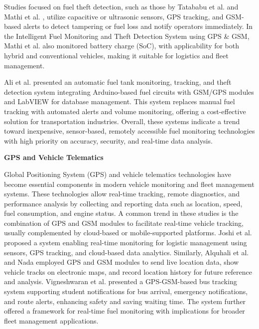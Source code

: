 Studies focused on fuel theft detection, such as those by Tatababu et al. \cite{tatababu2024smart} and Mathi et al. \cite{mathi2024development}, utilize capacitive or ultrasonic sensors, GPS tracking, and GSM-based alerts to detect tampering or fuel loss and notify operators immediately. In the Intelligent Fuel Monitoring and Theft Detection System using GPS \& GSM, Mathi et al. \cite{mathi2024development} also monitored battery charge (SoC), with applicability for both hybrid and conventional vehicles, making it suitable for logistics and fleet management.

Ali et al. \cite{komal2018automatic} presented an automatic fuel tank monitoring, tracking, and theft detection system integrating Arduino-based fuel circuits with GSM/GPS modules and LabVIEW for database management. This system replaces manual fuel tracking with automated alerts and volume monitoring, offering a cost-effective solution for transportation industries. Overall, these systems indicate a trend toward inexpensive, sensor-based, remotely accessible fuel monitoring technologies with high priority on accuracy, security, and real-time data analysis.

\textbf{GPS and Vehicle Telematics}

Global Positioning System (GPS) and vehicle telematics technologies have become essential components in modern vehicle monitoring and fleet management systems. These technologies allow real-time tracking, remote diagnostics, and performance analysis by collecting and reporting data such as location, speed, fuel consumption, and engine status. A common trend in these studies is the combination of GPS and GSM modules to facilitate real-time vehicle tracking, usually complemented by cloud-based or mobile-supported platforms. Joshi et al. \cite{joshi2024intelligent} proposed a system enabling real-time monitoring for logistic management using sensors, GPS tracking, and cloud-based data analytics. Similarly, Alquhali et al. \cite{alquhali2019iot} and Nada \cite{nada2017design} employed GPS and GSM modules to send live location data, show vehicle tracks on electronic maps, and record location history for future reference and analysis. Vigneshwaran et al. \cite{vigneshwaran2020design} presented a GPS-GSM-based bus tracking system supporting student notifications for bus arrival, emergency notifications, and route alerts, enhancing safety and saving waiting time. The system further offered a framework for real-time fuel monitoring with implications for broader fleet management applications.

